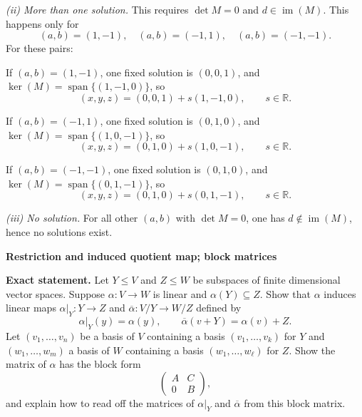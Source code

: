 \begin{solution}
\emph{(ii) More than one solution.}
This requires \(\det M=0\) and \(d\in\operatorname{im}(M)\). This happens only for
\[
(a,b)=(1,-1),\quad (a,b)=(-1,1),\quad (a,b)=(-1,-1).
\]
For these pairs:

	\par\noindent\textbullet\quad If \((a,b)=(1,-1)\), one fixed solution is \((0,0,1)\), and \(\ker(M)=\operatorname{span}\{(1,-1,0)\}\), so
	\[
	(x,y,z)=(0,0,1)+s(1,-1,0),\qquad s\in\mathbb R.
	\]
	\par\noindent\textbullet\quad If \((a,b)=(-1,1)\), one fixed solution is \((0,1,0)\), and \(\ker(M)=\operatorname{span}\{(1,0,-1)\}\), so
	\[
	(x,y,z)=(0,1,0)+s(1,0,-1),\qquad s\in\mathbb R.
	\]
	\par\noindent\textbullet\quad If \((a,b)=(-1,-1)\), one fixed solution is \((0,1,0)\), and \(\ker(M)=\operatorname{span}\{(0,1,-1)\}\), so
	\[
	(x,y,z)=(0,1,0)+s(0,1,-1),\qquad s\in\mathbb R.
	\]

\emph{(iii) No solution.}
For all other \((a,b)\) with \(\det M=0\), one has \(d\notin \operatorname{im}(M)\), hence no solutions exist.
\end{solution}

\begin{problem}[CP-I-0066]
\label{prob:cp-i-0066}
\textbf{Restriction and induced quotient map; block matrices}

\textbf{Exact statement.}
\hspace*{1.5em}Let $Y\le V$ and $Z\le W$ be subspaces of finite dimensional vector spaces.
Suppose $\alpha:V\to W$ is linear and $\alpha(Y)\subseteq Z$.
Show that $\alpha$ induces linear maps $\alpha|_Y:Y\to Z$ and
$\overline{\alpha}:V/Y\to W/Z$ defined by
\[
\alpha|_Y(y)=\alpha(y),\qquad \overline{\alpha}(v+Y)=\alpha(v)+Z.
\]
Let $(v_1,\dots,v_n)$ be a basis of $V$ containing a basis $(v_1,\dots,v_k)$ for $Y$ and
$(w_1,\dots,w_m)$ a basis of $W$ containing a basis $(w_1,\dots,w_\ell)$ for $Z$.
Show the matrix of $\alpha$ has the block form
\[
\begin{pmatrix}
	A & C\\
	0 & B
\end{pmatrix},
\]
and explain how to read off the matrices of $\alpha|_Y$ and $\overline{\alpha}$ from this block matrix.
\end{problem}

